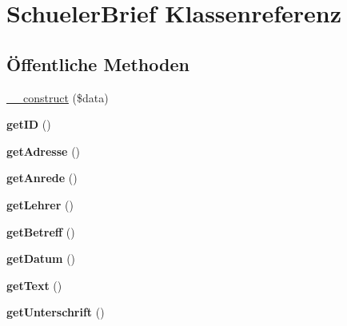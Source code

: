 \hypertarget{class_schueler_brief}{}\section{Schueler\+Brief Klassenreferenz}
\label{class_schueler_brief}
\subsection*{Öffentliche Methoden}
\begin{DoxyCompactItemize}
\item 
\mbox{\hyperlink{class_schueler_brief_a93df58d28c115be9495fc53e5af66960}{\+\_\+\+\_\+construct}} (\$data)
\item 
\mbox{\label{class_schueler_brief_a62457587a949f0225f346b29be394ca5}} 
{\bfseries get\+ID} ()
\item 
\mbox{\label{class_schueler_brief_af40d1e8fd5c79d73e6db8c449a2b8e98}} 
{\bfseries get\+Adresse} ()
\item 
\mbox{\label{class_schueler_brief_a51b4ea1d5f6c250829a6402b68f0cd4f}} 
{\bfseries get\+Anrede} ()
\item 
\mbox{\label{class_schueler_brief_a768279283787fdf5fcd3e20c52be2fa6}} 
{\bfseries get\+Lehrer} ()
\item 
\mbox{\label{class_schueler_brief_a9b5019fe20fa4a699bf41e5d15ceef35}} 
{\bfseries get\+Betreff} ()
\item 
\mbox{\label{class_schueler_brief_a47ebde5a5352b69132c271cb2924b128}} 
{\bfseries get\+Datum} ()
\item 
\mbox{\label{class_schueler_brief_abd1630b19540637efe091a2cd1ba3010}} 
{\bfseries get\+Text} ()
\item 
\mbox{\label{class_schueler_brief_a909b0cef22d19b3d9c3dcc70f2868456}} 
{\bfseries get\+Unterschrift} ()
\item 
\mbox{\label{class_schueler_brief_a719268c3d71ccefc8b03f7e06e66ed04}} 

\end{DoxyCompactItemize}
